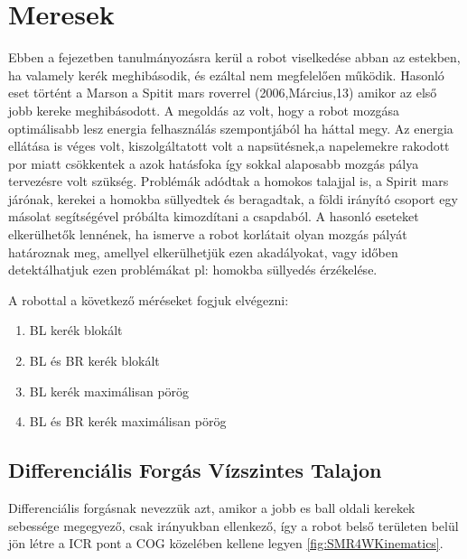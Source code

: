 \section{Meresek}
Ebben a fejezetben tanulmányozásra kerül a robot viselkedése abban az estekben, ha valamely kerék meghibásodik, és ezáltal nem megfelelően működik.
Hasonló eset történt a Marson a Spitit mars roverrel (2006,Március,13) \cite{SpititWheel1} amikor az első jobb kereke meghibásodott. A megoldás az volt, hogy a robot mozgása optimálisabb lesz energia felhasználás szempontjából ha háttal megy. Az energia ellátása is véges volt, kiszolgáltatott volt a napsütésnek,a napelemekre rakodott por miatt csökkentek a azok hatásfoka így sokkal alaposabb mozgás pálya tervezésre volt szükség.
Problémák adódtak a homokos talajjal is, a Spirit mars járónak, kerekei a homokba süllyedtek és beragadtak, a földi irányító csoport egy másolat segítségével próbálta kimozdítani a csapdaból.
A hasonló eseteket elkerülhetők lennének, ha ismerve a robot korlátait olyan mozgás pályát határoznak meg, amellyel elkerülhetjük ezen akadályokat, vagy időben detektálhatjuk ezen problémákat pl: homokba süllyedés érzékelése.


A robottal a következő méréseket fogjuk elvégezni:
\begin{enumerate}[label=(\alph*)]
\item BL kerék blokált
\item BL és BR kerék blokált
\item BL kerék maximálisan pörög
\item BL és BR kerék maximálisan pörög
\end{enumerate}


\subsection{Differenciális Forgás Vízszintes Talajon}

Differenciális forgásnak nevezzük azt, amikor a jobb es ball oldali kerekek sebessége megegyező, csak irányukban ellenkező, így a robot belső területen belül jön létre a ICR pont a COG közelében kellene legyen \ref{fig:SMR4WKinematics}. 















